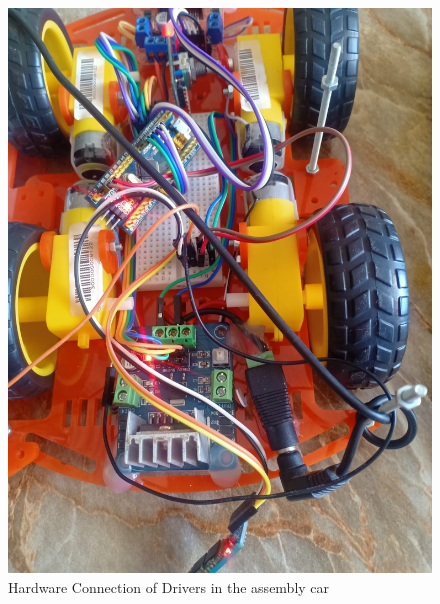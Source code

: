 \begin{figure}[h]
    \centering
    \includegraphics[width=.8\textwidth]{figures/9_13.jpg}
    \caption{Hardware Connection of Drivers in the assembly car}
    \label{fig:hardware-driver-cars}
\end{figure}

